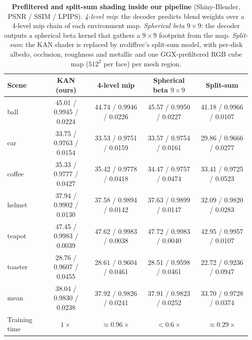 \begin{table}[t]
\color{addcolor}
\centering
\scriptsize
\setlength{\tabcolsep}{3pt}
\caption{\textbf{Prefiltered and split-sum shading inside our pipeline} (Shiny-Blender, PSNR /
SSIM / LPIPS). \emph{4-level mip}: the decoder predicts blend weights over a 4-level mip chain of
each environment map. \emph{Spherical beta $9{\times}9$}: the decoder outputs a spherical beta
kernel that gathers a $9{\times}9$ footprint from the map. \emph{Split-sum}: the KAN shader is
replaced by nvdiffrec's split-sum model, with per-disk albedo, occlusion, roughness and metallic
and one GGX-prefiltered RGB cube map ($512^2$ per face) per mesh region.}
\label{tab:splitsum}
\begin{tabular}{@{}lcccc@{}}
\toprule
Scene & KAN (ours) & 4-level mip & Spherical beta $9{\times}9$ & Split-sum \\
\midrule
ball    & 45.01 / 0.9945 / 0.0224 & 44.74 / 0.9946 / 0.0226 & 45.57 / 0.9950 / 0.0227 & 41.18 / 0.9966 / 0.0107 \\
car     & 33.75 / 0.9763 / 0.0154 & 33.53 / 0.9751 / 0.0159 & 33.57 / 0.9754 / 0.0161 & 29.86 / 0.9666 / 0.0277 \\
coffee  & 35.33 / 0.9777 / 0.0427 & 35.42 / 0.9778 / 0.0418 & 34.47 / 0.9757 / 0.0474 & 33.41 / 0.9725 / 0.0523 \\
helmet  & 37.94 / 0.9902 / 0.0130 & 37.58 / 0.9894 / 0.0142 & 37.63 / 0.9899 / 0.0147 & 32.09 / 0.9820 / 0.0283 \\
teapot  & 47.45 / 0.9983 / 0.0039 & 47.62 / 0.9983 / 0.0038 & 47.72 / 0.9983 / 0.0040 & 42.95 / 0.9957 / 0.0107 \\
toaster & 28.76 / 0.9607 / 0.0455 & 28.61 / 0.9604 / 0.0461 & 28.51 / 0.9598 / 0.0461 & 22.72 / 0.9236 / 0.0947 \\
\midrule
mean    & 38.04 / 0.9830 / 0.0238 & 37.92 / 0.9826 / 0.0241 & 37.91 / 0.9823 / 0.0252 & 33.70 / 0.9728 / 0.0374 \\
\midrule
Training time & $1\times$ & $\approx0.96\times$ & $<0.6\times$ & $\approx0.29\times$ \\
\bottomrule
\end{tabular}
\end{table}

